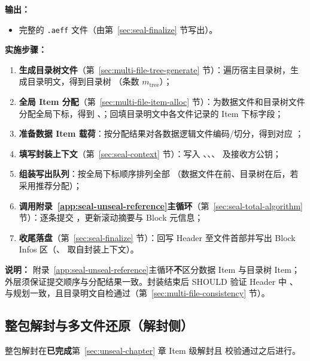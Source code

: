 \textbf{输出：}
\begin{itemize}
  \item 完整的 \texttt{.aeff} 文件（由第~\ref{sec:seal-finalize} 节写出）。
\end{itemize}

\textbf{实施步骤：}
\begin{enumerate}
  \item \textbf{生成目录树文件}（第~\ref{sec:multi-file-tree-generate} 节）：遍历宿主目录树，生成目录明文，得到目录树 （条数 $m_{\mathrm{tree}}$）；
  \item \textbf{全局 Item 分配}（第~\ref{sec:multi-file-item-alloc} 节）：为数据文件和目录树文件分配全局下标，得到 、；回填目录明文中各文件记录的 Item 下标字段；
  \item \textbf{准备数据 Item 载荷}：按分配结果对各数据逻辑文件编码/切分，得到对应 ；
  \item \textbf{填写封装上下文}（第~\ref{sec:seal-context} 节）：写入 、、、 及接收方公钥；
  \item \textbf{组装写出队列}：按全局下标顺序排列全部 （数据文件在前、目录树在后，若采用推荐分配）；
  \item \textbf{调用附录~\ref{app:seal-unseal-reference}主循环}（第~\ref{sec:seal-total-algorithm} 节）：逐条提交 ，更新滚动摘要与 Block 元信息；
  \item \textbf{收尾落盘}（第~\ref{sec:seal-finalize} 节）：回写 Header 至文件首部并写出 Block Infos 区（、 取自封装上下文）。
\end{enumerate}

\textbf{说明：}
附录~\ref{app:seal-unseal-reference}主循环\textbf{不}区分数据 Item 与目录树 Item；外层须保证提交顺序与分配结果一致。封装结束后 SHOULD 验证 Header 中 、 与规划一致，且目录明文自检通过（第~\ref{sec:multi-file-consistency} 节）。

\subsection{整包解封与多文件还原（解封侧）}\label{sec:multi-file-unseal-restore}
\label{sec:directory-tree-unseal}

整包解封在\textbf{已完成}第~\ref{sec:unseal-chapter} 章 Item 级解封且  校验通过之后进行。

